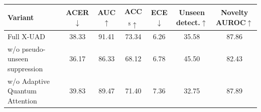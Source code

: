 \begin{tabular}{lcccccc}
\toprule
Variant & ACER$\downarrow$ & AUC$\uparrow$ & ACC$_8\uparrow$ & ECE$\downarrow$ & Unseen detect.$\uparrow$ & Novelty AUROC$\uparrow$ \\
\midrule
Full X-UAD & 38.33 & 91.41 & 73.34 & 6.26 & 35.58 & 87.86 \\
w/o pseudo-unseen suppression & 36.17 & 86.33 & 68.12 & 6.78 & 45.50 & 82.43 \\
w/o Adaptive Quantum Attention & 39.83 & 89.47 & 71.40 & 7.36 & 32.75 & 87.89 \\
\bottomrule
\end{tabular}